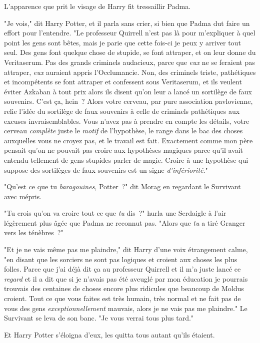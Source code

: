 L'apparence que prit le visage de Harry fit tressaillir Padma.

"Je vois," dit Harry Potter, et il parla sans crier, si bien que Padma dut faire un effort pour l'entendre. "Le professeur Quirrell n'est pas là pour m'expliquer à quel point les gens sont bêtes, mais je parie que cette fois-ci je peux y arriver tout seul. Des gens font quelque chose de stupide, se font attraper, et on leur donne du Veritaserum. Pas des grands criminels audacieux, parce que \emph{eux} ne se feraient pas attraper, \emph{eux} auraient appris l'Occlumancie. Non, des criminels triste, pathétiques et incompétents se font attraper et confessent sous Veritaserum, et ils veulent éviter Azkaban à tout prix alors ils disent qu'on leur a lancé un sortilège de faux souvenirs. C'est ça, hein~? Alors votre cerveau, par pure association pavlovienne, relie l'idée du sortilège de faux souvenirs à celle de criminels pathétiques aux excuses invraisemblables. Vous n'avez pas à prendre en compte les détails, votre cerveau \emph{complète} juste le \emph{motif} de l'hypothèse, le range dans le bac des choses auxquelles vous ne croyez pas, et le travail est fait. Exactement comme mon père pensait qu'on ne pouvait pas croire aux hypothèses magiques parce qu'il avait entendu tellement de gens stupides parler de magie. Croire à une hypothèse qui suppose des sortilèges de faux souvenirs est un signe \emph{d'infériorité}."

"Qu'est ce que tu \emph{baragouines}, Potter~?" dit Morag en regardant le Survivant avec mépris.

"Tu crois qu'on va croire tout ce que \emph{tu} dis~?" hurla une Serdaigle à l'air légèrement plus âgée que Padma ne reconnut pas. "Alors que \emph{tu} a tiré Granger vers les ténèbres~?"

"Et je ne vais même pas me plaindre," dit Harry d'une voix étrangement calme, "en disant que les sorciers ne sont pas logiques et croient aux choses les plus folles. Parce que j'ai déjà dit ça au professeur Quirrell et il m'a juste lancé ce \emph{regard} et il a dit que si je n'avais pas été aveuglé par mon éducation je pourrais trouvais des centaines de choses encore plus ridicules que beaucoup de Moldus croient. Tout ce que vous faites est très humain, très normal et ne fait pas de vous des gens \emph{exceptionnellement} mauvais, alors je ne vais pas me plaindre." Le Survivant se leva de son banc. "Je vous verrai tous plus tard."

Et Harry Potter s'éloigna d'eux, les quitta tous autant qu'ils étaient.

